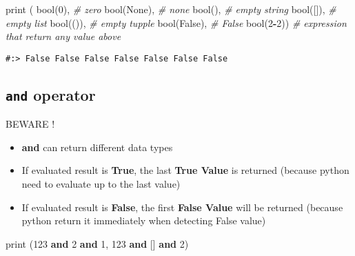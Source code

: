 \documentclass[
]{book}
\newenvironment{Shaded}{\begin{snugshade}}{\end{snugshade}}
\newcommand{\BuiltInTok}[1]{#1}
\newcommand{\CommentTok}[1]{\textcolor[rgb]{0.37,0.37,0.37}{\textit{#1}}}
\newcommand{\DecValTok}[1]{\textcolor[rgb]{0.06,0.06,0.06}{#1}}
\newcommand{\KeywordTok}[1]{\textcolor[rgb]{0.27,0.27,0.27}{\textbf{#1}}}
\newcommand{\NormalTok}[1]{#1}
\newcommand{\OperatorTok}[1]{\textcolor[rgb]{0.43,0.43,0.43}{\textbf{#1}}}
\newcommand{\StringTok}[1]{\textcolor[rgb]{0.5,0.5,0.5}{#1}}
\newcommand{\VariableTok}[1]{\textcolor[rgb]{0,0,0}{#1}}
\providecommand{\tightlist}{%
  \setlength{\itemsep}{0pt}\setlength{\parskip}{0pt}}
\begin{document}
\begin{Shaded}
\begin{Highlighting}[]
\BuiltInTok{print}\NormalTok{ ( }\BuiltInTok{bool}\NormalTok{(}\DecValTok{0}\NormalTok{),      }\CommentTok{\# zero}
        \BuiltInTok{bool}\NormalTok{(}\VariableTok{None}\NormalTok{),  }\CommentTok{\# none}
        \BuiltInTok{bool}\NormalTok{(}\StringTok{\textquotesingle{}\textquotesingle{}}\NormalTok{),    }\CommentTok{\# empty string}
        \BuiltInTok{bool}\NormalTok{([]),    }\CommentTok{\# empty list}
        \BuiltInTok{bool}\NormalTok{(()),    }\CommentTok{\# empty tupple}
        \BuiltInTok{bool}\NormalTok{(}\VariableTok{False}\NormalTok{), }\CommentTok{\# False}
        \BuiltInTok{bool}\NormalTok{(}\DecValTok{2}\OperatorTok{{-}}\DecValTok{2}\NormalTok{))    }\CommentTok{\# expression that return any value above}
\end{Highlighting}
\end{Shaded}

\begin{verbatim}
#:> False False False False False False False
\end{verbatim}

\hypertarget{and-operator}{%
\subsection{\texorpdfstring{\texttt{and} operator}{and operator}}\label{and-operator}}

BEWARE !

\begin{itemize}
\tightlist
\item
  \textbf{and} can return different data types\\
\item
  If evaluated result is \textbf{True}, the last \textbf{True Value} is returned (because python need to evaluate up to the last value)\\
\item
  If evaluated result is \textbf{False}, the first \textbf{False Value} will be returned (because python return it immediately when detecting False value)
\end{itemize}

\begin{Shaded}
\begin{Highlighting}[]
\BuiltInTok{print}\NormalTok{ (}\DecValTok{123} \KeywordTok{and} \DecValTok{2} \KeywordTok{and} \DecValTok{1}\NormalTok{,}
       \DecValTok{123} \KeywordTok{and}\NormalTok{ [] }\KeywordTok{and} \DecValTok{2}\NormalTok{)}
\end{Highlighting}
\end{Shaded}
\end{document}
